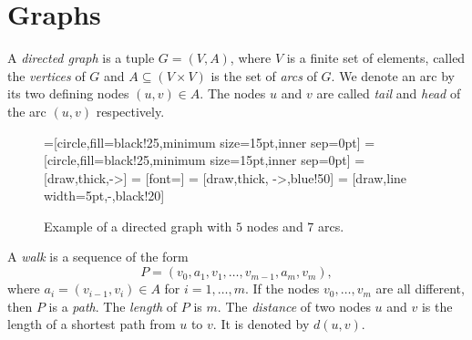 



\section{Graphs}
\label{sec:graphs}


\begin{definition}
  \label{def:3}
  A \emph{directed  graph} is a tuple $G = (V,A)$, where $V$ is a finite set of elements, called the
    \emph{vertices} of $G$ and  $A\subseteq(V\times V)$ is the set of
  \emph{arcs} of $G$. We denote an arc by its two defining nodes $(u,v) \in
  A$. The nodes $u$ and $v$ are called  \emph{tail}  and  \emph{head}
  of the arc $(u,v)$ respectively. 
\end{definition}



\begin{figure}
  \centering 
  =[circle,fill=black!25,minimum size=15pt,inner sep=0pt]
    = [circle,fill=black!25,minimum size=15pt,inner sep=0pt]
    = [draw,thick,->]
    = [font=\small]
    = [draw,thick, ->,blue!50]
    = [draw,line width=5pt,-,black!20]
   
   
  \caption{Example of a directed graph with $5$ nodes and $7$ arcs.}
\label{ex:graph}
\end{figure}




\begin{definition}
  \label{f:def:6}
  A \emph{walk} is a sequence of the form
  $$P=(v_0,a_1,v_1,\ldots,v_{m-1},a_m,v_m),$$ where  $a_i =
  (v_{i-1},v_i)\in A$ for $i=1,\ldots,m$. If the nodes $v_0,\ldots,v_m$ are all
  different, then $P$ is a \emph{path}. The \emph{length } of $P$ is
  $m$. The \emph{distance} of two nodes  $u$ and $v$ is the length of
  a shortest path from $u$ to $v$. It is denoted by $d(u,v)$. 
\end{definition}


